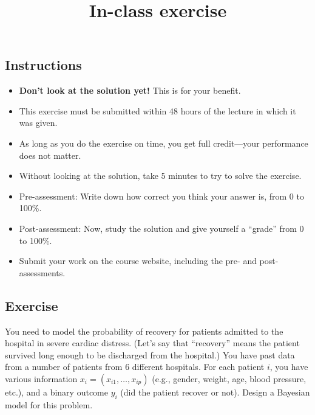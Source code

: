 \documentclass[12pt]{article}
\title{In-class exercise}
\author{}
\date{}
\begin{document}
\maketitle

\subsection*{Instructions}
\begin{itemize}
\item \textbf{Don't look at the solution yet!} This is for your benefit.
\item This exercise must be submitted within 48 hours of the lecture in which it was given. 
\item As long as you do the exercise on time, you get full credit---your performance does not matter.
\item Without looking at the solution, take 5 minutes to try to solve the exercise.
\item Pre-assessment: Write down how correct you think your answer is, from 0 to 100\%.
\item Post-assessment: Now, study the solution and give yourself a ``grade'' from 0 to 100\%.
\item Submit your work on the course website, including the pre- and post- assessments.
\end{itemize}

\subsection*{Exercise}
You need to model the probability of recovery for patients admitted to the hospital in severe cardiac distress.
(Let's say that ``recovery'' means the patient survived long enough to be discharged from the hospital.)
You have past data from a number of patients from 6 different hospitals.
For each patient $i$, you have various information $x_i = (x_{i 1},\ldots,x_{i p})$ (e.g., gender, weight, age, blood pressure, etc.),
and a binary outcome $y_i$ (did the patient recover or not).
Design a Bayesian model for this problem.
\end{document}
